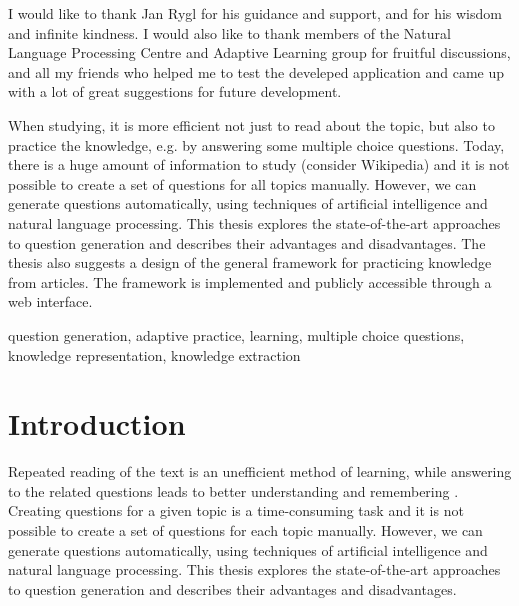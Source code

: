 \documentclass[12pt, twoside]{fithesis2}		%
\renewcommand{\_}{\leavevmode \kern0.07em\vbox{\hrule width0.4em}}
\newcounter{choice}
\begin{document}
\FrontMatter
\ThesisTitlePage

\begin{ThesisDeclaration}
\DeclarationText
\AdvisorName
\end{ThesisDeclaration}

\begin{ThesisThanks}
  I would like to thank Jan Rygl
  for his guidance and support, and for his wisdom and infinite kindness.
  I would also like to thank members of the Natural Language Processing Centre
  and Adaptive Learning group for fruitful discussions,
  and all my friends who helped me to test the develeped application
  and came up with a lot of great suggestions for future development.
\end{ThesisThanks}

\begin{ThesisAbstract}
When studying, it is more efficient not just to read about the topic, but also to practice the knowledge, e.g. by answering some multiple choice questions.
Today, there is a huge amount of information to study (consider Wikipedia) and it is not possible to create a set of questions for all topics manually.
However, we can generate questions automatically, using techniques of artificial intelligence and natural language processing.
This thesis explores the state-of-the-art approaches to question generation and describes their advantages and disadvantages.
The thesis also suggests a design of the general framework for practicing knowledge from articles.
The framework is implemented and publicly accessible through a web interface.
\end{ThesisAbstract}

\begin{ThesisKeyWords}
question generation, adaptive practice,
learning,
multiple choice questions,
knowledge representation, knowledge extraction
\end{ThesisKeyWords}

\MainMatter
\tableofcontents

\chapter{Introduction}
\label{chap:intro}

Repeated reading of the text is an unefficient method of learning,
while answering to the related questions leads to better understanding and remembering \cite{edu-improve}.
Creating questions for a given topic is a time-consuming task
and it is not possible to create a set of questions for each topic manually.
However, we can generate questions automatically, using techniques of artificial intelligence and natural language processing.
This thesis explores the state-of-the-art approaches to question generation and describes their advantages and disadvantages.
\end{document}
